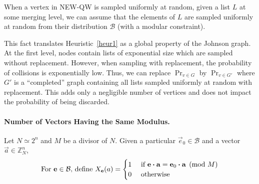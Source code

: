 \begin{fact}
When a vertex in \textsc{NEW-QW} is sampled uniformly at random, given a list $L$ at some merging level, we can assume that the elements of $L$ are sampled uniformly at random from their distribution $\mathcal{B}$ (with a modular constraint).
\end{fact}

This fact translates Heuristic~\ref{heur1} as a global property of the Johnson graph. At the first level, nodes contain lists of exponential size which are sampled without replacement. However, when sampling with replacement, the probability of collisions is exponentially low. Thus, we can replace $\Pr_{v \in G}$ by $\Pr_{v \in G'}$ where $G'$ is a ``completed'' graph containing all lists sampled uniformly at random with replacement. This adds only a negligible number of vertices and does not impact the probability of being discarded.



\paragraph{Number of Vectors Having the Same Modulus.}
Let $N \simeq 2^n$ and $M$ be a divisor of $N$. 
Given a particular $\vec{e}_0\in\mathcal{B}$ and a vector $\vec{a}\in\mathbb{Z}_{N}^n$, 
$$ \text{For $\mathbf{e}\in \mathcal{B}$, define } X_{\mathbf{e}}(a)= \begin{cases}
  1 & \text{ if } \mathbf{e}\boldsymbol{\cdot} \mathbf{a} = \mathbf{e}_0 \boldsymbol{\cdot} \mathbf{a} \pmod M\\
  0 & \text{ otherwise}
\end{cases}$$

